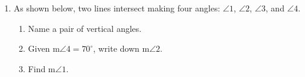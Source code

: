 \begin{enumerate}
  \item As shown below, two lines intersect making four angles: $\angle 1$, $\angle 2$, $\angle 3$, and $\angle 4$.
  \begin{multicols}{2}  
    \begin{enumerate}
      \item Name a pair of vertical angles. \vspace{1.5cm}
      \item Given m$\angle 4 = 70^\circ$, write down m$\angle 2$. \vspace{1.5cm}
      \item Find m$\angle 1$. \vspace{2cm}
    \end{enumerate}
  \end{multicols}
  

\end{enumerate}
